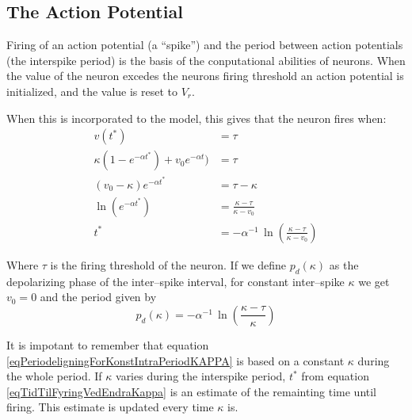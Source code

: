 \subsection{The Action Potential}
Firing of an action potential (a ``spike'') and the period between action potentials (the interspike period) is the basis of the conputational abilities of neurons.
When the value of the neuron excedes the neurons firing threshold an action potential is initialized, and the value is reset to $V_{r}$.

When this is incorporated to the model, this gives that the neuron fires when:
\begin{equation}
	\label{eqTidTilFyringVedEndraKappa}
	\begin{split}
			v(t^*) 					 							&= \tau \qquad 										\\	%
			\kappa (1-e^{-\alpha t^*}) + v_0 e^{-\alpha t})		&= \tau 											\\
			(v_0-\kappa)e^{-\alpha t^*}							&= \tau-\kappa 										\\
			\ln \left(e^{-\alpha t^*}\right) 					&= \frac{\kappa - \tau}{\kappa - v_0} 					\\
			t^*													&= -\alpha^{-1} \, \ln \left( \frac{\kappa - \tau}{\kappa - v_0} \right) 					
	\end{split}
\end{equation}

Where $\tau$ is the firing threshold of the neuron. 
If we define $p_d(\kappa)$ as the depolarizing phase of the inter--spike interval, for constant inter--spike $\kappa$ we get $v_0 = 0$ and the period given by
\begin{equation}
	\label{eqPeriodeligningForKonstIntraPeriodKAPPA}
	p_d(\kappa) = -\alpha^{-1} \, \ln(\frac{\kappa - \tau}{\kappa})
\end{equation}

It is impotant to remember that equation \eqref{eqPeriodeligningForKonstIntraPeriodKAPPA} is based on a constant $\kappa$ during the whole period. 
If $\kappa$ varies during the interspike period, $t^*$ from equation \eqref{eqTidTilFyringVedEndraKappa} is an estimate of the remainting time until firing. This estimate is updated every time $\kappa$ is.



